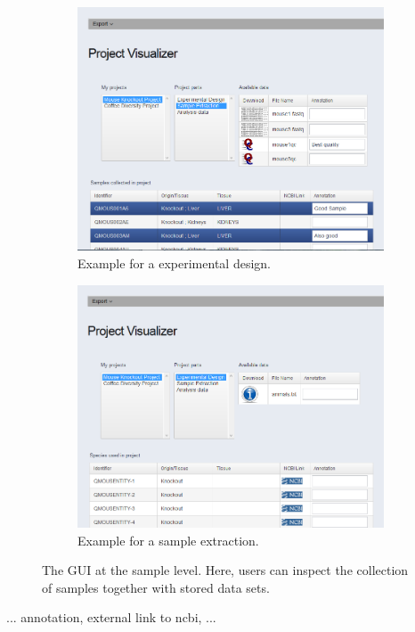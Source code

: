 \documentclass[a4paper, 11pt]{article}
\begin{document}
\begin{figure}[H]
\begin{subfigure}[b]{.45\linewidth}
\centering
\includegraphics[scale=0.26]{GUI_2.png}
\caption{{Example for a experimental design.}}
\label{fig:gui2}
\end{subfigure}%
\quad
\begin{subfigure}[b]{.45\linewidth}
\centering
\includegraphics[scale=0.25]{GUI_3.png}
\caption{{Example for a sample extraction.}}
\label{fig:gui2}
\end{subfigure}%
\caption{The GUI at the sample level. Here, users can inspect the collection of samples together with stored data sets.}
\label{fig:gui2_3}
\end{figure}
\noindent
... annotation, external link to ncbi, ...
\end{document}
